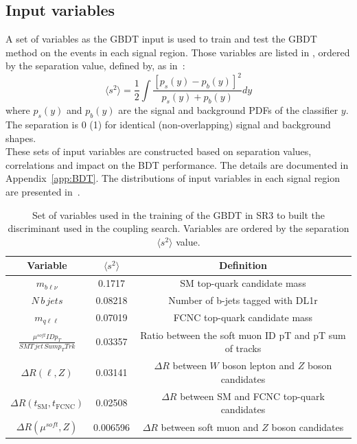 \subsection {Input variables}
A set of variables as the GBDT input is used to train and test the GBDT method on the events in
each signal region. Those variables are listed in , ordered by the separation value, defined by, as in~\cite{TMVA}:
\begin{equation*}
\langle s^{2}\rangle = \frac{1}{2}\int \frac{[p_{s}(y)-p_{b}(y)]^{2}}{p_{s}(y)+p_{b}(y)}dy
\end{equation*}
where $p_{s}(y)$ and $p_{b}(y)$ are the signal and background PDFs of the classifier $y$. 
The separation is 0 (1) for identical (non-overlapping) signal and background shapes.\\
These sets of input variables are constructed based on separation values, correlations and impact on the BDT performance. The details are documented in Appendix~\ref{app:BDT}.  
The distributions of input variables in each signal region are presented in~.

\begin{table}[!htbp]
	\small
	\centering
	\begin{tabular}{ccc}
		\toprule
		Variable & $\langle s^{2}\rangle$  & Definition \\
		\midrule
		$m_{b\ell\nu}$  &  0.1717  &  SM top-quark candidate mass  \\
		$N\,b\,jets$  &  0.08218  &  Number of b-jets tagged with DL1r  \\
		$m_{q\ell\ell}$  &  0.07019  &  FCNC top-quark candidate mass  \\
		$\frac{\mu^{soft} ID p_{T}}{SMT\,jet\,Sum p_{T} Trk}$  &  0.03357  &  Ratio between the soft muon ID pT and pT sum of tracks  \\
		$\Delta R(\ell,Z)$  &  0.03141  &  $\Delta R$ between $W$ boson lepton and $Z$ boson candidates  \\
		$\Delta R(t_{\text{SM}},t_{\text{FCNC}})$  &  0.02508  &  $\Delta R$ between SM and FCNC top-quark candidates  \\
		$\Delta R(\mu^{soft},Z)$  &  0.006596  &  $\Delta R$ between soft muon and $Z$ boson candidates  \\
		\bottomrule
	\end{tabular}
	\caption{
	Set of variables used in the training of the GBDT in SR3 to built the \Dthree discriminant used in the \tZc coupling search. Variables are ordered by the separation 	$\langle s^{2}\rangle$ value. }
	\label{tab:D3input}
\end{table}
\newpage
